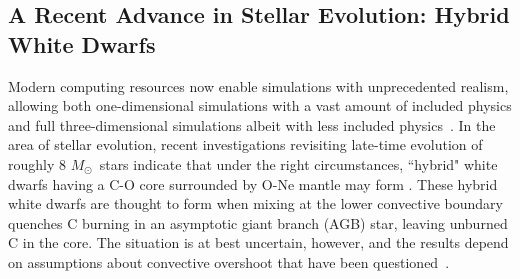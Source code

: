 \documentclass[iop,apj]{emulateapj}
\newcommand{\Msun}{\ensuremath{M_\odot}}
\begin{document}
%
%
%
%
%
%
%
%
%

\subsection{A Recent Advance in Stellar Evolution: Hybrid White Dwarfs}

Modern computing resources now enable simulations with unprecedented
realism, allowing both one-dimensional simulations with a vast
amount of included physics and full three-dimensional simulations
albeit with less included physics~\citep[][and references therein]{caldertownsley2018}.
In the area of stellar evolution, recent investigations revisiting
late-time evolution of roughly 8 \Msun~stars indicate that under
the right circumstances, ``hybrid" white dwarfs having a C-O core surrounded by O-Ne
mantle may form \citep{siess2009,denissenkovetal2013}. These hybrid
white dwarfs are thought to form when mixing at the lower convective boundary quenches
C burning in an asymptotic giant branch (AGB) star, leaving unburned C
in the core. The situation is at best uncertain, however, and the
results depend on assumptions about convective
overshoot that have been questioned~\citep{chenetal2014,lecoanetetal16,lattanzioetal2017}.
\end{document}
